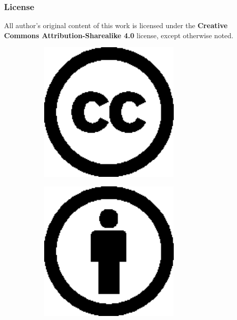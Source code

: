 \begin{frame}
\frametitle{License}
\begin{center}
    All author's original content of this work is licensed under the \textbf{Creative Commons Attribution-Sharealike 4.0} license, except otherwise noted.
\end{center}
\begin{figure}
    \centering
    \begin{subfigure}[b]{0.25\textwidth}
        \centering
        \includegraphics[width=0.75\textwidth]{assets/cc.eps}
    \end{subfigure}
    \begin{subfigure}[b]{0.25\textwidth}
        \centering
        \includegraphics[width=0.75\textwidth]{assets/by.eps}

\end{subfigure}
\end{figure}
\end{frame}
